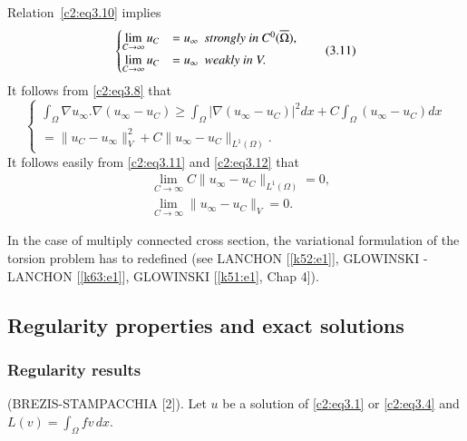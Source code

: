 Relation~\eqref{c2:eq3.10} implies 
\begin{equation}
\begin{cases}
\lim\limits_{C\to \infty} u_C  & = u_\infty ~~ \text{\em strongly in }
C^0 (\overline{\Omega}),\\ 
\lim\limits_{C \to \infty} u_C & = u_\infty~~  \text{\em weakly in }V.
\end{cases}\tag{3.11}\label{c2:eq3.11} 
\end{equation}\pageoriginale 
It follows from \eqref{c2:eq3.8} that 
\begin{equation}
 \begin{cases}
\int_\Omega \nabla u_\infty. \nabla (u_\infty - u_C ) \geq \int_\Omega
| \nabla (u_\infty - u_C) | ^2 dx + C \int_\Omega (u_\infty - u_C )dx
\\ 
= \parallel  u_C - u_\infty \parallel  ^2 _V + C \parallel  u_\infty - u_C \parallel  _{L^1(\Omega)}.
\end{cases}\tag{3.12}\label{c2:eq3.12}
\end{equation}  
 It follows easily from \eqref{c2:eq3.11} and \eqref{c2:eq3.12} that 
\begin{align*}
&\lim_{C \to \infty} C \parallel  u_\infty - u_C \parallel  _{L^1 (\Omega)} = 0,\\
&\lim_{C \to \infty} \parallel  u_\infty - u_C \parallel  _V = 0. 
\end{align*} 
 
\begin{remark}\label{c2:rem3.3}%
In the case of multiply connected cross section, the variational
formulation of the torsion problem has to redefined (see LANCHON
[\ref{k52:e1}], 
GLOWINSKI - LANCHON [\ref{k63:e1}], GLOWINSKI [\ref{k51:e1}, Chap 4]). 
\end{remark}
  

\subsection{Regularity properties and exact solutions}\label{c2:ss3.3}%
  
\subsubsection{Regularity results}\label{c2:sss3.3.1}%
  
\begin{theorem}\label{c2:thm3.2}%
(BREZIS-STAMPACCHIA [2]). Let $u$ be a solution of \eqref{c2:eq3.1} or 
\eqref{c2:eq3.4} and $L (v) = \int_\Omega fv\,dx$. 
\end{theorem}
  
